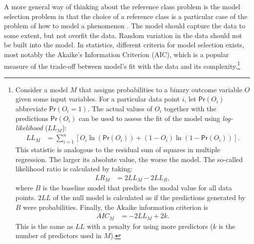 \documentclass{article}
\newcommand{\pr}{\mathsf{Pr}}
\begin{document}
A more general way of thinking about the reference class problem is the model selection problem
in that the choice of a reference class is a particular case of the problem of how to model a phenomenon \citep{cheng2009practical}. %
The model should capture the data to some extent, but not overfit the data. Random variation in the data should not be built into the model. %
In statistics, different criteria for model selection exists, most notably the Akaike's Information Criterion (AIC), which is a popular measure of the trade-off between  model's fit with the data and its complexity.\footnote{
	Consider a model $M$ that assigns  probabilities to a binary outcome variable $O$ given some input variables. For  a particular data point $i$, let $\pr(O_i)$ abbreviate  $\pr(O_i=1)$.  The actual values of $O_i$ together with the predictions $\pr(O_i)$ can be used to assess the fit of the model using \emph{log-likelihood} ($LL_M$):
	\begin{align*}
	LL_M & = \sum_{i=1}^{n}\left[O_i \ln (\pr(O_i)) + (1- O_i) \ln (1 - \pr(O_i)) \right].
	\end{align*}
	This statistic is analogous to the residual sum of squares in multiple regression. %
	The larger its absolute value, the worse the model.  The so-called likelihood ratio is calculated by taking:
		 \begin{align*}LR_M & = 2LL_M - 2LL_B, \end{align*}
		where $B$ is the baseline model that predicts the modal value for all data points.  %
		$2LL$ of the null model is calculated as if the predictions generated by $B$ were probabilities. Finally, the Akaike information criterion is 
			\begin{align*}
			AIC_M & = -2 LL_M +2 k.
			\end{align*}
			\noindent This is the same as  $LL$ with a  penalty for using more predictors ($k$ is the number of predictors used in $M$).}
\end{document}
